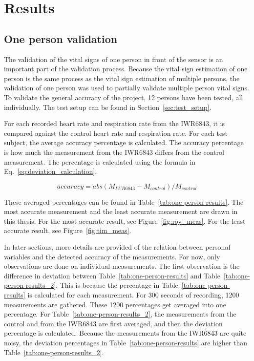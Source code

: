 \section{Results}
\subsection{One person validation}
\label{sec:one_pers_validation}
The validation of the vital signs of one person in front of the sensor is an important part of the validation process. Because the vital sign estimation of one person is the same process as the vital sign estimation of multiple persons, the validation of one person was used to partially validate multiple person vital signs. To validate the general accuracy of the project, 12 persons have been tested, all individually. The test setup can be found in Section~\ref{sec:test_setup}. 

For each recorded heart rate and respiration rate from the IWR6843, it is compared against the control heart rate and respiration rate. For each test subject, the average accuracy percentage is calculated. The accuracy percentage is how much the measurement from the IWR6843 differs from the control measurement. The percentage is calculated using the formula in Eq.~\ref{eq:deviation_calculation}.

\begin{equation}
    accuracy = abs(M_{IWR6843} - M_{control}) / M_{control}
    \label{eq:deviation_calculation}
\end{equation}

These averaged percentages can be found in Table~\ref{tab:one-person-results}. The most accurate measurement and the least accurate measurement are drawn in this thesis. For the most accurate result, see Figure~\ref{fig:roy_meas}. For the least accurate result, see Figure~\ref{fig:tim_meas}.

In later sections, more details are provided of the relation between personal variables and the detected accuracy of the measurements. For now, only observations are done on individual measurements. The first observation is the difference in deviation between Table~\ref{tab:one-person-results} and Table~\ref{tab:one-person-results_2}. This is because the percentage in Table~\ref{tab:one-person-results} is calculated for each measurement. For 300 seconds of recording, 1200 measurements are gathered. These 1200 percentages get averaged into one percentage. For Table~\ref{tab:one-person-results_2}, the measurements from the control and from the IWR6843 are first averaged, and then the deviation percentage is calculated. Because the measurements from the IWR6843 are quite noisy, the deviation percentages in Table~\ref{tab:one-person-results} are higher than Table~\ref{tab:one-person-results_2}.

